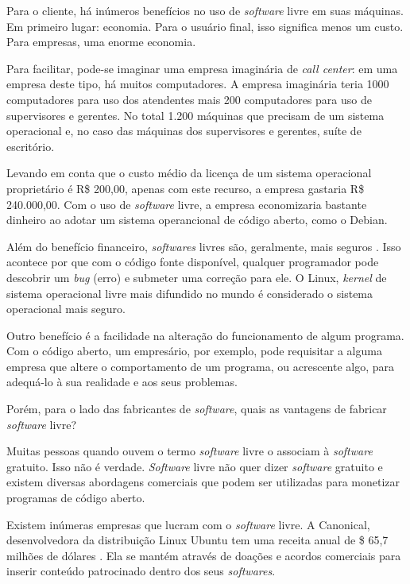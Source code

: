 \documentclass{classe_cn}                 %
\begin{document}
Para o cliente, há inúmeros benefícios no uso de \textit{software} livre em suas máquinas. Em primeiro lugar: economia. Para o usuário final, isso significa menos um custo. Para empresas, uma enorme economia.

Para facilitar, pode-se imaginar uma empresa imaginária de \textit{call center}: em uma empresa deste tipo, há muitos computadores. A empresa imaginária teria 1000 computadores para uso dos atendentes mais 200 computadores para uso de supervisores e gerentes. No total 1.200 máquinas que precisam de um sistema operacional e, no caso das máquinas dos supervisores e gerentes, suíte de escritório.

Levando em conta que o custo médio da licença de um sistema operacional proprietário é R\$ 200,00, apenas com este recurso, a empresa gastaria R\$ 240.000,00. Com o uso de \textit{software} livre, a empresa economizaria bastante dinheiro ao adotar um sistema operancional de código aberto, como o Debian.

Além do benefício financeiro, \textit{softwares} livres são, geralmente, mais seguros \cite{Castro}. Isso acontece por que com o código fonte disponível, qualquer programador pode descobrir um \textit{bug} (erro) e submeter uma correção para ele. O Linux, \textit{kernel} de sistema operacional livre mais difundido no mundo é considerado o sistema operacional mais seguro.

Outro benefício é a facilidade na alteração do funcionamento de algum programa. Com o código aberto, um empresário, por exemplo, pode requisitar a alguma empresa que altere o comportamento de um programa, ou acrescente algo, para adequá-lo à sua realidade e aos seus problemas.

Porém, para o lado das fabricantes de \textit{software}, quais as vantagens de fabricar \textit{software} livre?

Muitas pessoas quando ouvem o termo \textit{software} livre o associam à \textit{software} gratuito. Isso não é verdade. \textit{Software} livre não quer dizer \textit{software} gratuito e existem diversas abordagens comerciais que podem ser utilizadas para monetizar programas de código aberto.

Existem inúmeras empresas que lucram com o \textit{software} livre. A Canonical, desenvolvedora da distribuição Linux Ubuntu tem uma receita anual de \$ 65,7 milhões de dólares \cite{Brodkin}. Ela se mantém através de doações e acordos comerciais para inserir conteúdo patrocinado dentro dos seus \textit{softwares}.
\end{document}
